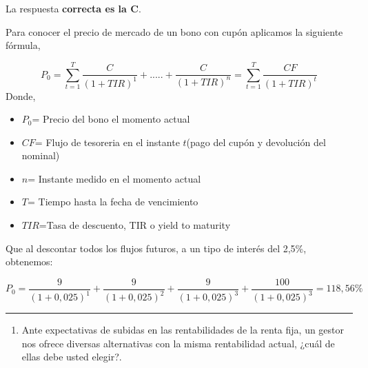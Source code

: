 \documentclass[
  letterpaper,
  DIV=11,
  numbers=noendperiod]{scrreprt}
\providecommand{\tightlist}{%
  \setlength{\itemsep}{0pt}\setlength{\parskip}{0pt}}\usepackage{longtable,booktabs,array}
\begin{document}
\begin{tcolorbox}[enhanced jigsaw, left=2mm, opacityback=0, colback=white, breakable, arc=.35mm, bottomrule=.15mm, rightrule=.15mm, toprule=.15mm, leftrule=.75mm, colframe=quarto-callout-tip-color-frame]
\begin{minipage}[t]{5.5mm}
\textcolor{quarto-callout-tip-color}{\faLightbulb}
\end{minipage}%
\begin{minipage}[t]{\textwidth - 5.5mm}

La respuesta \textbf{correcta es la C}.

Para conocer el precio de mercado de un bono con cupón aplicamos la
siguiente fórmula,

\[P_{ 0 }=\sum _{ t=1 }^{ T }{ \frac { C }{ { (1+TIR) }^{ 1 } }  } +.....+\frac { C }{ { (1+TIR) }^{ n } } =\sum _{ t=1 }^{ T }{ \frac { CF }{ { (1+TIR) }^{ t } }  } \]
Donde,

\begin{itemize}
\item
  \(P_0\)= Precio del bono el momento actual
\item
  \(CF\)= Flujo de tesoreria en el instante \(t\)(pago del cupón y
  devolución del nominal)
\item
  \(n\)= Instante medido en el momento actual
\item
  \(T\)= Tiempo hasta la fecha de vencimiento
\item
  \(TIR\)=Tasa de descuento, TIR o yield to maturity
\end{itemize}

Que al descontar todos los flujos futuros, a un tipo de interés del
2,5\%, obtenemos:

\[P_0= \frac{ 9}{ (1+ 0,025)^{1}}+\frac{ 9}{ (1+ 0,025)^{2}}+\frac{9 }{ (1+ 0,025)^{3}}+\frac{100 }{ (1+ 0,025)^{3}}=118,56\% \]

\end{minipage}%
\end{tcolorbox}

\begin{center}\rule{0.5\linewidth}{0.5pt}\end{center}

\begin{enumerate}
\def\labelenumi{\arabic{enumi}.}
\setcounter{enumi}{101}
\tightlist
\item
  Ante expectativas de subidas en las rentabilidades de la renta fija,
  un gestor nos ofrece diversas alternativas con la misma rentabilidad
  actual, ¿cuál de ellas debe usted elegir?.
\end{enumerate}
\end{document}

